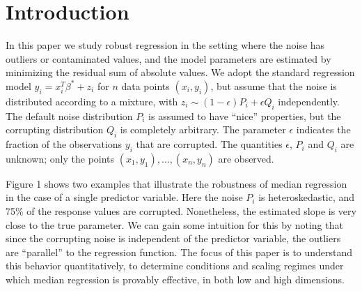 
\section{Introduction}
\label{sec:intro}

In this paper we study robust regression in the setting where the noise has outliers or contaminated values,
and the model parameters are estimated by minimizing the residual sum of absolute values. We adopt the standard regression model $y_i=x_i^T\beta^*+z_i$ for $n$ data points $(x_i,y_i)$, but assume that the noise is distributed according to a mixture, with $z_i\sim (1-\epsilon)P_i+\epsilon Q_i$ independently. The default noise distribution $P_i$ is assumed to have ``nice'' properties, but the corrupting distribution
$Q_i$ is completely arbitrary. The parameter $\epsilon$ indicates the fraction of the observations $y_i$ that are corrupted. The quantities $\epsilon$, $P_i$ and $Q_i$ are unknown; only the points $(x_1, y_1), \ldots, (x_n, y_n)$ are observed.


Figure 1 shows two examples that illustrate the robustness of median regression
in the case of a single predictor variable. Here the noise $P_i$ is heteroskedastic, and 75\% of the response values are corrupted. Nonetheless, the estimated slope is very close to the true parameter. We can gain some intuition for this by noting that since the corrupting noise is independent of the predictor variable, the outliers are ``parallel'' to the regression function. The focus of this paper is to understand this behavior quantitatively, to determine conditions and scaling regimes under which median regression is provably effective, in both low and high dimensions.

